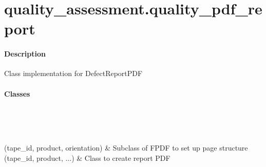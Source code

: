 \documentclass[letterpaper,10pt,english]{sphinxmanual}
\begin{document}
\chapter{quality\_assessment.quality\_pdf\_report}
\label{\detokenize{generated/quality_assessment.quality_pdf_report:quality-assessment-quality-pdf-report}}\label{\detokenize{generated/quality_assessment.quality_pdf_report::doc}}\subsubsection*{Description}
\label{\detokenize{generated/quality_assessment.quality_pdf_report:module-quality_assessment.quality_pdf_report}}
\sphinxAtStartPar
Class implementation for DefectReportPDF
\subsubsection*{Classes}


\begin{savenotes}\sphinxatlongtablestart\begin{longtable}[c]{}
\hline

\endfirsthead

%
{}\\
\hline

\endhead

\hline
{}\\
\endfoot

\endlastfoot

\sphinxAtStartPar
{\hyperref[\detokenize{generated/quality_assessment.quality_pdf_report.DefectReportPDF:quality_assessment.quality_pdf_report.DefectReportPDF}]{}}(tape\_id, product, orientation)
&
\sphinxAtStartPar
Subclass of FPDF to set up page structure
\\
\hline
\sphinxAtStartPar
{\hyperref[\detokenize{generated/quality_assessment.quality_pdf_report.ReportPDFCreator:quality_assessment.quality_pdf_report.ReportPDFCreator}]{}}(tape\_id, product, ...)
&
\sphinxAtStartPar
Class to create report PDF
\\
\hline
\end{longtable}\sphinxatlongtableend\end{savenotes}
\end{document}
